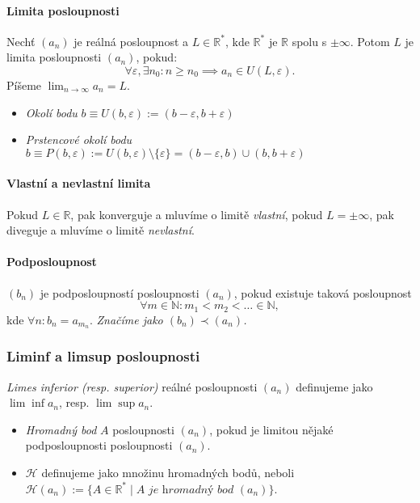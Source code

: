 \documentclass[10pt,a4paper]{article}
\newcommand{\N}{{\mathbb{N}}}
\newcommand{\R}{{\mathbb{R}}}
\begin{document}
\paragraph*{Limita posloupnosti}

Nechť $(a_n)$ je reálná posloupnost a $L \in \R ^*$, kde $\R^*$ je $\R$ spolu s $\pm \infty$.
Potom $L$ je limita posloupnosti $(a_n)$, pokud:
 \[\forall \varepsilon, \exists n_0: n \geq n_0 \implies a_n \in U(L, \varepsilon).\]  Píšeme $\displaystyle \lim_{n\to \infty} a_n = L$.
 
\begin{itemize}
    \item \textit{Okolí bodu} $b \equiv U(b, \varepsilon):= (b-\varepsilon, b+\varepsilon)$
    \item \textit{Prstencové okolí bodu} $b \equiv P(b, \varepsilon):= U(b, \varepsilon)\setminus \{\varepsilon\} = (b-\varepsilon, b) \cup (b, b+\varepsilon)$
\end{itemize}

\paragraph*{Vlastní a nevlastní limita}

Pokud $L \in \R$, pak konverguje a mluvíme o limitě \textit{vlastní}, pokud $L=\pm \infty$, pak diveguje a mluvíme o limitě \textit{nevlastní}.

\paragraph*{Podposloupnost} $(b_n)$ je podposloupností posloupnosti $(a_n)$, pokud existuje taková posloupnost $$\forall m \in \N: m_1 < m_2 < \dots \in \N,$$ kde $\forall n: b_n = a_{m_n}$. \textit{Značíme jako $(b_n) \prec (a_n)$.}

\subsubsection{Liminf a limsup posloupnosti}
\textit{Limes inferior (resp. superior)} reálné posloupnosti $(a_n)$ definujeme jako $\lim \inf a_n$, resp. $\lim \sup a_n$.

\begin{itemize}
    \item \textit{Hromadný bod} $A$ posloupnosti $(a_n)$, pokud je limitou nějaké podposloupnosti posloupnosti $(a_n)$.
    \item $\mathcal{H}$ definujeme jako množinu hromadných bodů, neboli $\mathcal{H}(a_n):= \{A\in \R^* \mid A \textit{ je hromadný bod } (a_n)\}$.
\end{itemize}
\end{document}
